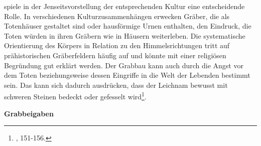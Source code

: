 \documentclass[openany,twoside,twocolumn]{book}
\let\rmarkdownfootnote\footnote%
\def\footnote{\protect\rmarkdownfootnote}
\begin{document}
spiele in der Jenseitsvorstellung der entsprechenden Kultur eine entscheidende Rolle. In verschiedenen Kulturzusammenhängen erwecken Gräber, die als Totenhäuser gestaltet sind oder hausförmige Urnen enthalten, den Eindruck, die Toten würden in ihren Gräbern wie in Häusern weiterleben. Die systematische Orientierung des Körpers in Relation zu den Himmelsrichtungen tritt auf prähistorischen Gräberfeldern häufig auf und könnte mit einer religiösen Begründung gut erklärt werden. Der Grabbau kann auch durch die Angst vor dem Toten beziehungsweise dessen Eingriffe in die Welt der Lebenden bestimmt sein. Das kann sich dadurch ausdrücken, dass der Leichnam bewusst mit schweren Steinen bedeckt oder gefesselt wird\footnote{\textcite{hofmann_rituelle_2008}, 151-156.}.

\textbf{Grabbeigaben} \newline 
\end{document}
